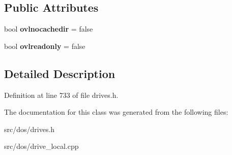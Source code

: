 \subsection*{Public Attributes}
\begin{DoxyCompactItemize}
\item 
\hypertarget{classOverlay__Drive_ad8072b518286a6558d894bfd3d7067fc}{bool {\bfseries ovlnocachedir} = false}\label{classOverlay__Drive_ad8072b518286a6558d894bfd3d7067fc}

\item 
\hypertarget{classOverlay__Drive_a6324e8cd8eb193bf70d1208dad2b884e}{bool {\bfseries ovlreadonly} = false}\label{classOverlay__Drive_a6324e8cd8eb193bf70d1208dad2b884e}

\end{DoxyCompactItemize}


\subsection{Detailed Description}


Definition at line 733 of file drives.\-h.



The documentation for this class was generated from the following files\-:\begin{DoxyCompactItemize}
\item 
src/dos/drives.\-h\item 
src/dos/drive\-\_\-local.\-cpp\end{DoxyCompactItemize}
